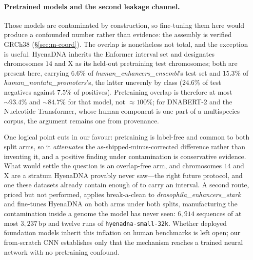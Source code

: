 \documentclass[webpdf,modern,large,namedate]{oup-authoring-template}%
\begin{document}
\paragraph{Pretrained models and the second leakage channel.}\label{sec:d-pretrain}
Those models are contaminated by construction, so fine-tuning them here would produce a confounded number rather than evidence: the assembly is verified GRCh38 (\S\ref{sec:m-coord}). The overlap is nonetheless not total, and the exception is useful. HyenaDNA inherits the Enformer interval set \citep{avsec2021enformer} and designates chromosomes $14$ and X as its held-out pretraining test chromosomes; both are present here, carrying $6.6\%$ of \textit{human\_enhancers\_ensembl}'s test set and $15.3\%$ of \textit{human\_nontata\_promoters}'s, the latter unevenly by class ($24.6\%$ of test negatives against $7.5\%$ of positives). Pretraining overlap is therefore at most ${\sim}93.4\%$ and ${\sim}84.7\%$ for that model, not ${\approx}100\%$; for DNABERT-2 and the Nucleotide Transformer, whose human component is one part of a multispecies corpus, the argument remains one from provenance.

One logical point cuts in our favour: pretraining is label-free and common to both split arms, so it \emph{attenuates} the as-shipped-minus-corrected difference rather than inventing it, and a positive finding under contamination is conservative evidence. What would settle the question is an overlap-free arm, and chromosomes $14$ and X are a stratum HyenaDNA provably never saw---the right future protocol, and one these datasets already contain enough of to carry an interval. A second route, priced but not performed, applies break-a-clean to \textit{drosophila\_enhancers\_stark} and fine-tunes HyenaDNA on both arms under both splits, manufacturing the contamination inside a genome the model has never seen: $6{,}914$ sequences of at most $3{,}237$\,bp and twelve runs of \texttt{hyenadna-small-32k}. Whether deployed foundation models inherit this inflation on human benchmarks is left open; our from-scratch CNN establishes only that the mechanism reaches a trained neural network with no pretraining confound.
\end{document}
